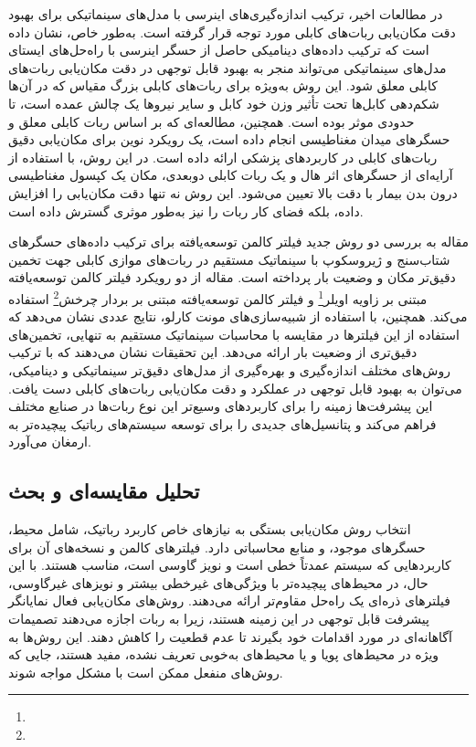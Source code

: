 در مطالعات اخیر، ترکیب اندازه‌گیری‌های اینرسی با مدل‌های سینماتیکی برای بهبود دقت مکان‌یابی ربات‌های کابلی مورد توجه قرار گرفته است. به‌طور خاص، 
\cite{murtra2013imu}
نشان داده است که ترکیب داده‌های دینامیکی حاصل از حسگر اینرسی با راه‌حل‌های ایستای مدل‌های سینماتیکی می‌تواند منجر به بهبود قابل توجهی در دقت مکان‌یابی ربات‌های کابلی معلق شود. این روش به‌ویژه برای ربات‌های کابلی بزرگ مقیاس که در آن‌ها شکم‌دهی کابل‌ها تحت تأثیر وزن خود کابل و سایر نیروها یک چالش عمده است، تا حدودی موثر بوده است. همچنین،
\cite{kim2020robotic}
مطالعه‌ای که بر اساس ربات کابلی معلق و حسگرهای میدان مغناطیسی انجام داده است، یک رویکرد نوین برای مکان‌یابی دقیق ربات‌های کابلی در کاربردهای پزشکی ارائه داده است. در این روش، با استفاده از آرایه‌ای از حسگرهای اثر هال و یک ربات کابلی دوبعدی، مکان یک کپسول مغناطیسی درون بدن بیمار با دقت بالا تعیین می‌شود. این روش نه تنها دقت مکان‌یابی را افزایش داده، بلکه فضای کار ربات را نیز به‌طور موثری گسترش داده است.

مقاله
\cite{le2021cable}
 به بررسی دو روش جدید فیلتر کالمن توسعه‌یافته برای ترکیب داده‌های حسگرهای شتاب‌سنج و ژیروسکوپ با سینماتیک مستقیم در ربات‌های موازی کابلی جهت تخمین دقیق‌تر مکان و وضعیت بار پرداخته است. مقاله از دو رویکرد فیلتر کالمن توسعه‌یافته مبتنی بر زاویه اویلر\footnote{}
  و فیلتر کالمن توسعه‌یافته مبتنی بر بردار چرخش\footnote{} استفاده می‌کند. همچنین، با استفاده از شبیه‌سازی‌های مونت کارلو، نتایج عددی نشان می‌دهد که استفاده از این فیلترها در مقایسه با محاسبات سینماتیک مستقیم به تنهایی، تخمین‌های دقیق‌تری از وضعیت بار ارائه می‌دهد. این تحقیقات نشان می‌دهند که با ترکیب روش‌های مختلف اندازه‌گیری و بهره‌گیری از مدل‌های دقیق‌تر سینماتیکی و دینامیکی، می‌توان به بهبود قابل توجهی در عملکرد و دقت مکان‌یابی ربات‌های کابلی دست یافت. این پیشرفت‌ها زمینه را برای کاربردهای وسیع‌تر این نوع ربات‌ها در صنایع مختلف فراهم می‌کند و پتانسیل‌های جدیدی را برای توسعه سیستم‌های رباتیک پیچیده‌تر به ارمغان می‌آورد.

\subsection{تحلیل مقایسه‌ای و بحث}

انتخاب روش مکان‌یابی بستگی به نیازهای خاص کاربرد رباتیک، شامل محیط، حسگرهای موجود، و منابع محاسباتی دارد. فیلترهای کالمن و نسخه‌های آن برای کاربردهایی که سیستم عمدتاً خطی است و نویز گاوسی است، مناسب هستند. با این حال، در محیط‌های پیچیده‌تر با ویژگی‌های غیرخطی بیشتر و نویزهای غیرگاوسی، فیلترهای ذره‌ای یک راه‌حل مقاوم‌تر ارائه می‌دهند. روش‌های مکان‌یابی فعال نمایانگر پیشرفت قابل توجهی در این زمینه هستند، زیرا به ربات اجازه می‌دهند تصمیمات آگاهانه‌ای در مورد اقدامات خود بگیرند تا عدم قطعیت را کاهش دهند. این روش‌ها به ویژه در محیط‌های پویا و یا محیط‌های به‌خوبی تعریف نشده، مفید هستند، جایی که روش‌های منفعل ممکن است با مشکل مواجه شوند.

